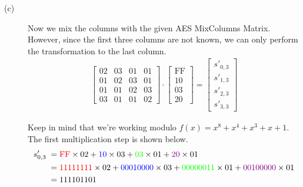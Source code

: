 \documentclass[../hw_sols.tex]{subfiles}
\begin{document}
\begin{solution}
\begin{description}
\item[(c)] Now we mix the columns with the given AES MixColumns Matrix. 
However, since the first three columns are not known, we can only perform the 
transformation to the last column.
\begin{align*}
	\begin{bmatrix}
		02 & 03 & 01 & 01 \\
		01 & 02 & 03 & 01 \\
		01 & 01 & 02 & 03 \\
		03 & 01 & 01 & 02 
	\end{bmatrix} 
	\cdot 
	\begin{bmatrix}
		\text{FF} \\ 10 \\ 03 \\ 20
	\end{bmatrix} 
	= 
	\begin{bmatrix}
		s'_{0,3} \\ s'_{1,3} \\ s'_{2,3} \\ s'_{3,3}
	\end{bmatrix}
\end{align*}

Keep in mind that we're working modulo $f(x) = x^8 + x^4 + x^3 + x + 1$. The 
first multiplication step is shown below.
\begin{align*}
	s'_{0,3} \; 
	=& \; {\color{red} \text{FF}} \times 02 
	+ {\color{blue} 10} \times 03 
	+ {\color{green} 03} \times 01 
	+ {\color{violet} 20} \times 01 \\
	=& \; {\color{red} 11111111} \times 02 
	+ {\color{blue} 00010000} \times 03 
	+ {\color{green} 00000011} \times 01 
	+ {\color{violet} 00100000} \times 01 \\
	=& \; 111101101
\end{align*}


\end{description}
\end{solution}
\end{document}
